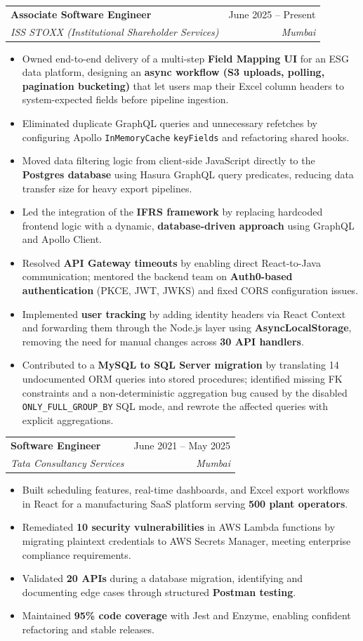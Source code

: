\documentclass[letterpaper,11pt]{article}
\makeatletter
\newcommand{\plus}{\raisebox{0.2ex}{\scalebox{0.75}{\textbf{+}}}}
\newcommand{\resumeItem}[1]{
\item\small{
    {#1 \vspace{-2pt}}
  }
}
\newcommand{\resumeSubheading}[4]{
  \vspace{-2pt}
\item
  \begin{tabular*}{0.97\textwidth}[t]{l@{\extracolsep{\fill}}r}
    \textbf{#1} & #2 \\
    \textit{\small#3} & \textit{\small #4} \\
  \end{tabular*}\vspace{-7pt}
}
\newcommand{\resumeSubSubheading}[2]{
\item
  \begin{tabular*}{0.97\textwidth}{l@{\extracolsep{\fill}}r}
    \textit{\small#1} & \textit{\small #2} \\
  \end{tabular*}\vspace{-7pt}
}
\newcommand{\resumeSubHeadingListEnd}{
\end{itemize}}
\newcommand{\resumeItemListStart}{
\begin{itemize}}
\newcommand{\resumeItemListEnd}{
\end{itemize}\vspace{-5pt}}
\makeatother
\begin{document}
\resumeSubheading
{Associate Software Engineer}{June 2025 -- Present}
{ISS STOXX (Institutional Shareholder Services)}{Mumbai}
\resumeItemListStart
\resumeItem{Owned end-to-end delivery of a multi-step \textbf{Field Mapping UI} for an ESG data platform, designing an \textbf{async workflow (S3 uploads, polling, pagination bucketing)} that let users map their Excel column headers to system-expected fields before pipeline ingestion.}
\resumeItem{Eliminated duplicate GraphQL queries and unnecessary refetches by configuring Apollo \texttt{InMemoryCache} \texttt{keyFields} and refactoring shared hooks.}
\resumeItem{Moved data filtering logic from client-side JavaScript directly to the \textbf{Postgres database} using Hasura GraphQL query predicates, reducing data transfer size for heavy export pipelines.}
\resumeItem{Led the integration of the \textbf{IFRS framework} by replacing hardcoded frontend logic with a dynamic, \textbf{database-driven approach} using GraphQL and Apollo Client.}
\resumeItem{Resolved \textbf{API Gateway timeouts} by enabling direct React-to-Java communication; mentored the backend team on \textbf{Auth0-based authentication} (PKCE, JWT, JWKS) and fixed CORS configuration issues.}
\resumeItem{Implemented \textbf{user tracking} by adding identity headers via React Context and forwarding them through the Node.js layer using \textbf{AsyncLocalStorage}, removing the need for manual changes across \textbf{30\plus{} API handlers}.}
\resumeItem{Contributed to a \textbf{MySQL to SQL Server migration} by translating 14 undocumented ORM queries into stored procedures; identified missing FK constraints and a non-deterministic aggregation bug caused by the disabled \texttt{ONLY\_FULL\_GROUP\_BY} SQL mode, and rewrote the affected queries with explicit aggregations.}
\resumeItemListEnd

\resumeSubheading
{Software Engineer}{June 2021 -- May 2025}
{Tata Consultancy Services}{Mumbai}
\resumeItemListStart
\resumeItem{Built scheduling features, real-time dashboards, and Excel export workflows in React for a manufacturing SaaS platform serving \textbf{500\plus{} plant operators}.}
\resumeItem{Remediated \textbf{10\plus{} security vulnerabilities} in AWS Lambda functions by migrating plaintext credentials to AWS Secrets Manager, meeting enterprise compliance requirements.}
\resumeItem{Validated \textbf{20\plus{} APIs} during a database migration, identifying and documenting edge cases through structured \textbf{Postman testing}.}
\resumeItem{Maintained \textbf{95\%\plus{} code coverage} with Jest and Enzyme, enabling confident refactoring and stable releases.}
\resumeItemListEnd
\end{document}
